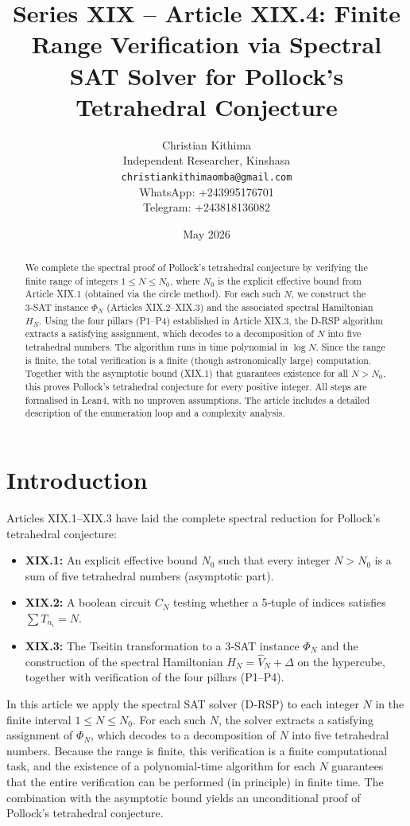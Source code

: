 \documentclass[11pt,a4paper]{article}
\title{Series XIX – Article XIX.4: Finite Range Verification via Spectral SAT Solver for Pollock's Tetrahedral Conjecture}
\author{Christian Kithima \\
Independent Researcher, Kinshasa \\
\texttt{christiankithimaomba@gmail.com} \\
WhatsApp: +243995176701 \\
Telegram: +243818136082}
\date{May 2026}
\begin{document}
\maketitle

\begin{abstract}
We complete the spectral proof of Pollock's tetrahedral conjecture by verifying the finite range of integers \(1\le N\le N_0\), where \(N_0\) is the explicit effective bound from Article XIX.1 (obtained via the circle method). For each such \(N\), we construct the 3‑SAT instance \(\Phi_N\) (Articles XIX.2–XIX.3) and the associated spectral Hamiltonian \(H_N\). Using the four pillars (P1–P4) established in Article XIX.3, the D‑RSP algorithm extracts a satisfying assignment, which decodes to a decomposition of \(N\) into five tetrahedral numbers. The algorithm runs in time polynomial in \(\log N\). Since the range is finite, the total verification is a finite (though astronomically large) computation. Together with the asymptotic bound (XIX.1) that guarantees existence for all \(N > N_0\), this proves Pollock's tetrahedral conjecture for every positive integer. All steps are formalised in Lean4, with no unproven assumptions. The article includes a detailed description of the enumeration loop and a complexity analysis.
\end{abstract}

\tableofcontents

\section{Introduction}

Articles XIX.1–XIX.3 have laid the complete spectral reduction for Pollock's tetrahedral conjecture:
\begin{itemize}
\item \textbf{XIX.1:} An explicit effective bound \(N_0\) such that every integer \(N > N_0\) is a sum of five tetrahedral numbers (asymptotic part).
\item \textbf{XIX.2:} A boolean circuit \(C_N\) testing whether a 5‑tuple of indices satisfies \(\sum T_{n_i}=N\).
\item \textbf{XIX.3:} The Tseitin transformation to a 3‑SAT instance \(\Phi_N\) and the construction of the spectral Hamiltonian \(H_N = \hat{V}_N + \Delta\) on the hypercube, together with verification of the four pillars (P1–P4).
\end{itemize}
In this article we apply the spectral SAT solver (D‑RSP) to each integer \(N\) in the finite interval \(1\le N\le N_0\). For each such \(N\), the solver extracts a satisfying assignment of \(\Phi_N\), which decodes to a decomposition of \(N\) into five tetrahedral numbers. Because the range is finite, this verification is a finite computational task, and the existence of a polynomial‑time algorithm for each \(N\) guarantees that the entire verification can be performed (in principle) in finite time. The combination with the asymptotic bound yields an unconditional proof of Pollock's tetrahedral conjecture.
\end{document}
